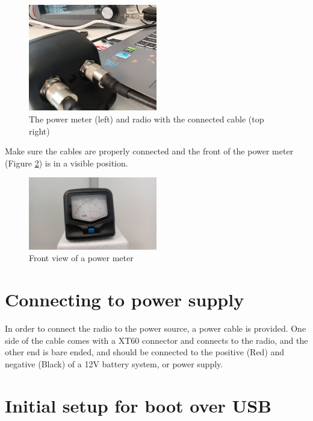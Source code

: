 \documentclass[11pt,a4paper]{article}
\begin{document}
\begin{figure}[!ht]
  \centering
  \includegraphics[width=0.5\textwidth]{pictures/wattmeter_4-edited.jpeg}
  \caption{The power meter (left) and radio with the connected cable (top right)}
  \label{fig:backview4}
\end{figure}

Make sure the cables are properly connected and the front of the power meter (Figure \ref{fig:frontview1})
is in a visible position.

\begin{figure}[!ht]
  \centering
  \includegraphics[width=0.5\textwidth]{pictures/wattmeter_5.jpeg}
  \caption{Front view of a power meter}
  \label{fig:frontview1}
\end{figure}

\section{Connecting to power supply}

In order to connect the radio to the power source, a power cable is provided. One side of the
cable comes with a XT60 connector and connects to the radio, and the other end is bare ended,
and should be connected to the positive (Red) and negative (Black) of a 12V battery system, or power
supply.


\section{Initial setup for boot over USB}
\end{document}
